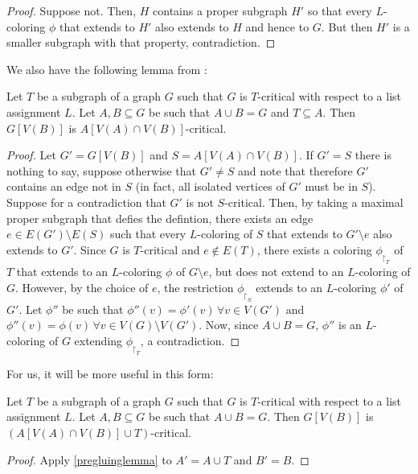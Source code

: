 \begin{proof}
Suppose not. Then, $H$ contains a proper subgraph $H'$ so that every $L$-coloring $\phi$ that extends to $H'$ also extends to $H$ and hence to $G$. But then $H'$ is a smaller subgraph with that property, contradiction. 
\end{proof}

We also have the following lemma from \cite{fivelistcoloring2}:

\begin{lemma}
\label{pregluinglemma}
Let $T$ be a subgraph of a graph $G$ such that $G$ is $T$-critical with respect to a list assignment $L$. Let $A, B \subseteq G$ be such that $A \cup B = G$ and $T \subseteq A$. Then $G[V(B)]$ is $A[V(A) \cap V(B)]$-critical.
\end{lemma}

\begin{proof} 
Let $G' = G[V(B)]$ and $S = A[V(A) \cap V(B)]$. If $G' = S$ there is nothing to say, suppose otherwise that $G' \neq S$ and note that therefore $G'$ contains an edge not in $S$ (in fact, all isolated vertices of $G'$ must be in $S$). Suppose for a contradiction that $G'$ is not $S$-critical. Then, by taking a maximal proper subgraph that defies the defintion, there exists an edge $e \in E(G') \setminus E(S)$ such that every $L$-coloring of $S$ that extends to $G' \setminus e$ also extends to $G'$. Since $G$ is $T$-critical and $e \not\in E(T)$, there exists a coloring $\phi_{\restriction_T}$ of $T$ that extends to an $L$-coloring $\phi$ of $G \setminus e$, but does not extend to an $L$-coloring of $G$. However, by the choice of $e$, the restriction $\phi_{\restriction_S}$ extends to an $L$-coloring $\phi'$ of $G'$. Let $\phi''$ be such that $\phi''(v) = \phi'(v) \, \forall v \in V(G')$ and $\phi''(v) = \phi(v) \, \forall v \in V(G) \setminus V(G')$. Now, since $A \cup B = G$, $\phi''$ is an $L$-coloring of $G$ extending $\phi_{\restriction_T}$, a contradiction.
\end{proof}

For us, it will be more useful in this form:

\begin{lemma}
\label{gluinglemma}
Let $T$ be a subgraph of a graph $G$ such that $G$ is $T$-critical with respect to a list assignment $L$. Let $A, B \subseteq G$ be such that $A \cup B = G$. Then $G[V(B)]$ is $(A[V(A) \cap V(B)] \cup T)$-critical.
\end{lemma}

\begin{proof} 
Apply \ref{pregluinglemma} to $A' = A \cup T$ and $B' = B$. 
\end{proof}

